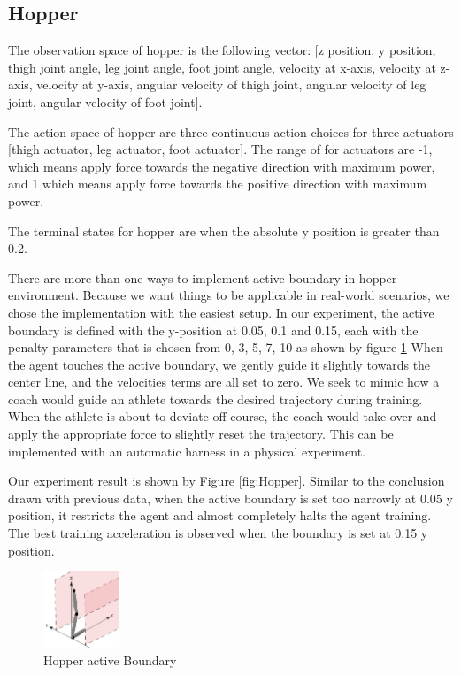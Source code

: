 \documentclass[journal]{IEEEtran}
\begin{document}
\subsection{Hopper}
The observation space of hopper is the following vector: [z position, y position, thigh joint angle, leg joint angle, foot joint angle, velocity at x-axis, velocity at z-axis, velocity at y-axis, angular velocity of thigh joint, angular velocity of leg joint, angular velocity of foot joint].

The action space of hopper are three continuous action choices for three actuators [thigh actuator, leg actuator, foot actuator]. The range of for actuators are -1, which means apply force towards the negative direction with maximum power, and 1 which means apply force towards the positive direction with maximum power.

The terminal states for hopper are when the absolute y position is greater than 0.2.

There are more than one ways to implement active boundary in hopper environment. Because we want things to be applicable in real-world scenarios, we chose the implementation with the easiest setup. In our experiment, the active boundary is defined with the y-position at 0.05, 0.1 and 0.15, each with the penalty parameters that is chosen from 0,-3,-5,-7,-10 as shown by figure \ref{fig:hopperPB} When the agent touches the active boundary, we gently guide it slightly towards the center line, and the velocities terms are all set to zero. We seek to mimic how a coach would guide an athlete towards the desired trajectory during training. When the athlete is about to deviate off-course, the coach would take over and apply the appropriate force to slightly reset the trajectory. This can be implemented with an automatic harness in a physical experiment.

Our experiment result is shown by Figure \ref{fig:Hopper}. Similar to the conclusion drawn with previous data, when the active boundary is set too narrowly at 0.05 y position, it restricts the agent and almost completely halts the agent training. The best training acceleration is observed when the boundary is set at 0.15 y position.

\begin{figure}
     \centering
      \includegraphics[width=0.2\textwidth]{hopper.png}
      \caption{Hopper active Boundary}
      \label{fig:hopperPB}
\end{figure}
\end{document}
